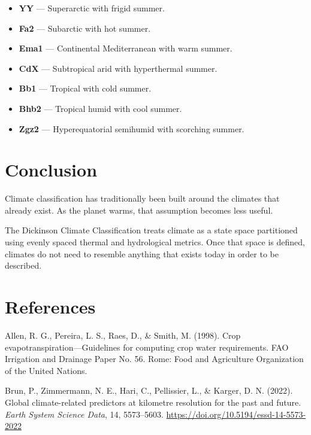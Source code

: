 \documentclass[12pt]{article}
\begin{document}
\begin{itemize}
  \item \textbf{YY} —
  Superarctic with frigid summer.

  \item \textbf{Fa2} —
  Subarctic with hot summer.
  
  \item \textbf{Ema1} —
  Continental Mediterranean with warm summer.

  \item \textbf{CdX} —
  Subtropical arid with hyperthermal summer.
  
  \item \textbf{Bb1} —
  Tropical with cold summer.

  \item \textbf{Bhb2} —
  Tropical humid with cool summer.

  \item \textbf{Zgz2} —
  Hyperequatorial semihumid with scorching summer.

\end{itemize}

\section*{Conclusion}

Climate classification has traditionally been built around the climates
that already exist. As the planet warms, that assumption becomes less
useful.

The Dickinson Climate Classification treats climate as a state
space partitioned using evenly spaced thermal and hydrological metrics.
Once that space is defined, climates do not need to resemble anything
that exists today in order to be described.


\section*{References}

Allen, R. G., Pereira, L. S., Raes, D., & Smith, M. (1998).
Crop evapotranspiration—Guidelines for computing crop water requirements.
FAO Irrigation and Drainage Paper No. 56. Rome: Food and Agriculture Organization of the United Nations.

Brun, P., Zimmermann, N. E., Hari, C., Pellissier, L., \& Karger, D. N. (2022).
Global climate-related predictors at kilometre resolution for the past and future.
\textit{Earth System Science Data}, 14, 5573--5603.
\url{https://doi.org/10.5194/essd-14-5573-2022}
\end{document}
